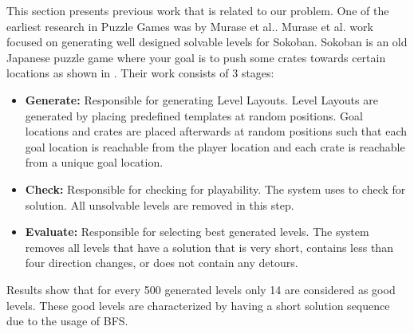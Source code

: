 This section presents previous work that is related to our problem. One of the earliest research in Puzzle Games was by Murase et al.\cite{sokobanLevelGenerationOld}. Murase et al. work focused on generating well designed solvable levels for Sokoban\cite{sokoban}. Sokoban is an old Japanese puzzle game where your goal is to push some crates towards certain locations as shown in . Their work consists of 3 stages:
\begin{itemize} \itemsep0pt \parskip0pt 
	\item \textbf{Generate:} Responsible for generating Level Layouts. Level Layouts are generated by placing predefined templates at random positions. Goal locations and crates are placed afterwards at random positions such that each goal location is reachable from the player location and each crate is reachable from a unique goal location.
	\item \textbf{Check:} Responsible for checking for playability. The system uses  to check for solution. All unsolvable levels are removed in this step.
	\item \textbf{Evaluate:} Responsible for selecting best generated levels. The system removes all levels that have a solution that is very short, contains less than four direction changes, or does not contain any detours.
\end{itemize}
Results show that for every 500 generated levels only 14 are considered as good levels. These good levels are characterized by having a short solution sequence due to the usage of BFS.\\\par

